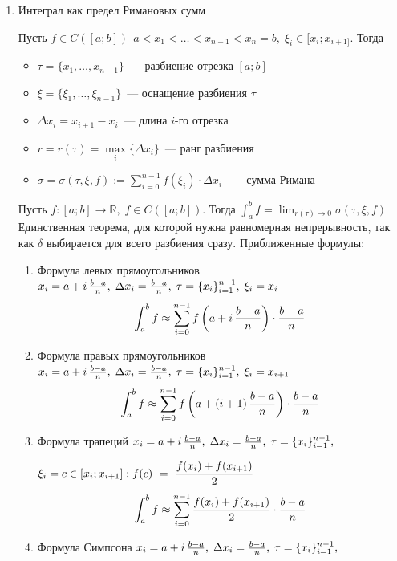 \documentclass[a4paper,12pt]{article}
\newcommand\R{\mathbb{R}}
\theoremstyle{plain}
\theoremstyle{definition}
\theoremstyle{remark}
\begin{document}
\begin{enumerate}
    {\thrm Пусть $f \in C([a;b])$. Тогда $\exists\, c\in (a;b) : f(c) = \langle f \rangle$.}
    См. теорему~\ref{thrm:int_average}.
  \item Интеграл как предел Римановых сумм
    {  Пусть $f\in C([a;b])\,\; a < x_1 < \dots < x_{n-1} < x_n = b,\; 
    \xi_i\in[x_i;x_{i+1]}$. Тогда 
    \begin{itemize}
      \item $\tau = \{x_1,\dots,x_{n-1}\}$~--- разбиение отрезка $[a;b]$
      \item $\xi = \{\xi_1,\dots,\xi_{n-1}\}$~--- оснащение разбиения $\tau$
      \item $\Delta x_i = x_{i+1}-x_i$~--- длина $i$-го отрезка
      \item $r=r(\tau) = \max\limits_i\{\Delta x_i\}$~--- ранг разбиения
      \item $\sigma = \sigma(\tau,\xi,f):= \sum\limits_{i=0}^{n-1}f(\xi_i)\cdot\Delta x_i$ ~---
        сумма Римана
    \end{itemize} }
    { \thrm Пусть $f:[a;b]\to\R,\; f\in C([a;b])$. 
      Тогда $\displaystyle\int_a^b f = \lim_{r(\tau)\to 0} \sigma(\tau,\xi,f)$ }
    Единственная теорема, для которой нужна равномерная непрерывность, так как $\delta$
    выбирается для всего разбиения сразу.
    Приближенные формулы:
    \begin{enumerate}
      \item Формула левых прямоугольников
        $x_i = a+i\,{b-a\over n},\; \Delta x_i = {b-a\over n} ,\; 
        \tau = \{x_i\}_{i=1}^{n-1},\; \xi_i=x_i$
        \[
          \int_a^bf \approx \sum_{i=0}^{n-1}f\left(a+i\,{b-a\over n}\right)\cdot{b-a\over n}
        \]
      \item Формула правых прямоугольников
        $x_i = a+i\,{b-a\over n},\; \Delta x_i = {b-a\over n} ,\; 
        \tau = \{x_i\}_{i=1}^{n-1},\; \xi_i=x_{i+1}$
        \[
          \int_a^bf \approx \sum_{i=0}^{n-1}f\left(a+(i+1)\,{b-a\over n}\right)\cdot{b-a\over n}
        \]
      \item Формула трапеций
        $x_i = a+i\,{b-a\over n},\; \Delta x_i = {b-a\over n} ,\; 
        \tau = \{x_i\}_{i=1}^{n-1},\;$ \par
        $\displaystyle \xi_i=c\in [x_i;x_{i+1}]:f(c)~=~{f(x_i)+f(x_{i+1}) \over2}$
        \[
          \int_a^bf \approx \sum_{i=0}^{n-1}{f(x_i)+f(x_{i+1})\over 2}\cdot{b-a\over n}
        \]
      \item Формула Симпсона
        $x_i = a+i\,{b-a\over n},\;\Delta x_i = {b-a\over n},\;\tau=\{x_i\}_{i=1}^{n-1},\;$\par 

\end{enumerate}
\end{enumerate}
\end{document}
